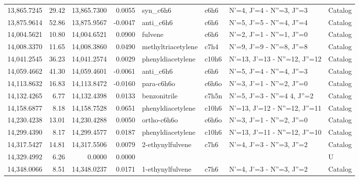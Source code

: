 \begin{longtable}{rrrrllll}
13,865.7245 &     29.42 &       13,865.7300 &    0.0055 &                    syn_c6h6 &    c6h6 &            N'=4, J'=4 - N''=3, J''=3 &    Catalog \\
13,875.9614 &     52.86 &       13,875.9567 &   -0.0047 &                   anti_c6h6 &    c6h6 &            N'=5, J'=5 - N''=4, J''=4 &    Catalog \\
14,004.5621 &     10.80 &       14,004.6521 &    0.0900 &                     fulvene &    c6h6 &            N'=2, J'=1 - N''=1, J''=0 &    Catalog \\
14,008.3370 &     11.65 &       14,008.3860 &    0.0490 &          methyltriacetylene &    c7h4 &            N'=9, J'=9 - N''=8, J''=8 &    Catalog \\
14,041.2545 &     36.23 &       14,041.2574 &    0.0029 &           phenyldiacetylene &   c10h6 &        N'=13, J'=13 - N''=12, J''=12 &    Catalog \\
14,059.4662 &     41.30 &       14,059.4601 &   -0.0061 &                   anti_c6h6 &    c6h6 &            N'=5, J'=4 - N''=4, J''=3 &    Catalog \\
14,113.8632 &     16.83 &       14,113.8472 &   -0.0160 &                  para-c6h6o &   c6h6o &            N'=3, J'=1 - N''=2, J''=0 &    Catalog \\
14,132.4265 &      6.77 &       14,132.4398 &    0.0133 &                benzonitrile &   c7h5n &      N'=5, J'=3 - N''=4     4, J''=2 &    Catalog \\
14,158.6877 &      8.18 &       14,158.7528 &    0.0651 &           phenyldiacetylene &   c10h6 &        N'=13, J'=12 - N''=12, J''=11 &    Catalog \\
14,230.4238 &     13.01 &       14,230.4288 &    0.0050 &                 ortho-c6h6o &   c6h6o &            N'=3, J'=1 - N''=2, J''=0 &    Catalog \\
14,299.4390 &      8.17 &       14,299.4577 &    0.0187 &           phenyldiacetylene &   c10h6 &        N'=13, J'=11 - N''=12, J''=10 &    Catalog \\
14,317.5427 &     14.81 &       14,317.5506 &    0.0079 &            2-ethynylfulvene &    c7h6 &            N'=4, J'=3 - N''=3, J''=2 &    Catalog \\
14,329.4992 &      6.26 &            0.0000 &    0.0000 &                             &         &                                      &          U \\
14,348.0066 &      8.51 &       14,348.0237 &    0.0171 &            1-ethynylfulvene &    c7h6 &            N'=4, J'=3 - N''=3, J''=2 &    Catalog \\

\end{longtable}

